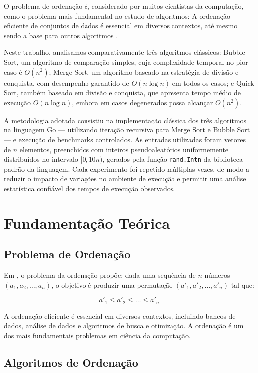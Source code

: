 \documentclass[12pt]{article}
\begin{document}
O problema de ordenação é, considerado por muitos cientistas da computação, como o problema mais fundamental no estudo de algoritmos: A ordenação eficiente de conjuntos de dados é essencial em diversos contextos, até mesmo sendo a base para outros algoritmos .

Neste trabalho, analisamos comparativamente três algoritmos clássicos: Bubble Sort, um algoritmo de comparação simples, cuja complexidade temporal no pior caso é $O(n^2)$; Merge Sort, um algoritmo baseado na estratégia de divisão e conquista, com desempenho garantido de $O(n \log n)$ em todos os casos; e Quick Sort, também baseado em divisão e conquista, que apresenta tempo médio de execução $O(n \log n)$, embora em casos degenerados possa alcançar $O(n^2)$.

A metodologia adotada consistiu na implementação clássica dos três algoritmos na linguagem Go \cite{golang} --- utilizando iteração recursiva para Merge Sort e Bubble Sort --- e execução de benchmarks controlados. As entradas utilizadas foram vetores de $n$ elementos, preenchidos com inteiros pseudoaleatórios uniformemente distribuídos no intervalo $[0, 10n)$, gerados pela função \texttt{rand.Intn} da biblioteca padrão da linguagem. Cada experimento foi repetido múltiplas vezes, de modo a reduzir o impacto de variações no ambiente de execução e permitir uma análise estatística confiável dos tempos de execução observados.

\section{Fundamentação Teórica}

\subsection{Problema de Ordenação}

Em \cite{cormen:2022}, o problema da ordenação propõe: dada uma sequência de $n$ números $(a_1, a_2, \ldots, a_n)$, o objetivo é produzir uma permutação $(a'_1, a'_2, \ldots, a'_n)$ tal que:

\[
a'_1 \leq a'_2 \leq \ldots \leq a'_n
\]

A ordenação eficiente é essencial em diversos contextos, incluindo bancos de dados, análise de dados e algoritmos de busca e otimização. A ordenação é um dos mais fundamentais problemas em ciência da computação. 

\subsection{Algoritmos de Ordenação}
\end{document}
